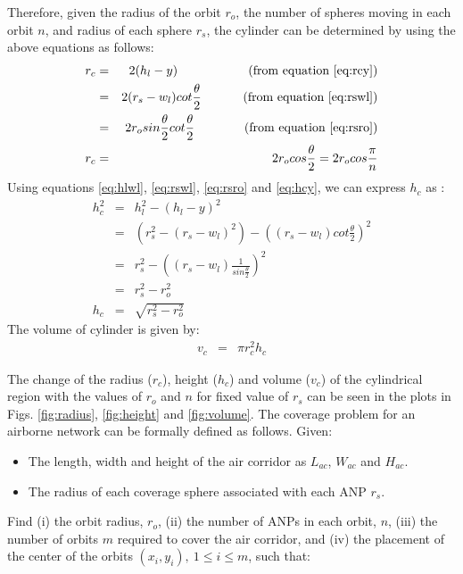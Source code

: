\documentclass[10pt]{IEEEtran}
\begin{document}
Therefore, given the radius of the orbit $r_{o}$, the number of spheres moving in each orbit $n$, and radius of each sphere $r_{s}$, the cylinder can be determined by using the above equations as follows:
\begin{eqnarray}
\label{eq:rc}
r_{c} & = & 2(h_{l}-y) ~~~~~~~~~~~~~~~~~(\textnormal{from equation \ref{eq:rcy}}) \nonumber\\
& = & 2(r_{s}-w_{l}) cot \frac{\theta}{2} ~~~~~~~~~~(\textnormal{from equation \ref{eq:rswl}}) \nonumber\\
& = & 2 r_{o} sin \frac{\theta}{2} cot \frac{\theta}{2} ~~~~~~~~~~~~(\textnormal{from equation \ref{eq:rsro}}) \nonumber\\
r_{c} & =  & 2 r_{o} cos \frac{\theta}{2} = 2 r_{o} cos \frac{\pi}{n}
\end{eqnarray}
Using equations \ref{eq:hlwl}, \ref{eq:rswl}, \ref{eq:rsro} and \ref{eq:hcy}, we can express $h_{c}$ as :
\begin{eqnarray}
h_{c}^{2} & = & h_{l}^{2} - (h_{l}-y)^{2} \nonumber\\
& = & (r_{s}^{2} - (r_{s}-w_{l})^{2}) - ((r_{s}-w_{l})cot \frac{\theta}{2})^{2}\nonumber \\
& = & r_{s}^{2} - ((r_{s} - w_{l})\frac{1}{sin \frac{\theta}{2}})^{2} \nonumber\\
& = & r_{s}^{2} - r_{o}^{2} \nonumber\\
h_{c} & = & \sqrt{r_{s}^{2} - r_{o}^{2}}\label{eq:hc}
\end{eqnarray}
The volume of cylinder is given by:
\begin{eqnarray}
\label{eq:vc}
v_{c} & = & \pi r_{c}^{2} h_{c}
\end{eqnarray}

The change of the radius ($r_{c}$), height ($h_{c}$) and volume ($v_{c}$) of the cylindrical region with the values of $r_{o}$ and $n$ for fixed value of $r_{s}$ can be seen in the plots in Figs. \ref{fig:radius}, \ref{fig:height} and \ref{fig:volume}. The coverage problem for an airborne network can be formally defined as follows. Given:
\begin{itemize}
	\item The length, width and height of the air corridor as $L_{ac}$, $W_{ac}$ and $H_{ac}$.
	\item  The radius of each coverage sphere associated with each ANP $r_{s}$.
\end{itemize}
Find (i) the orbit radius, $r_{o}$, (ii) the number of ANPs in each orbit, $n$, (iii)  the number of orbits $m$ required to cover the air corridor, and (iv) the placement of the center of the orbits $(x_{i},y_{i}),~1\leq i\leq m$, such that:
\end{document}

